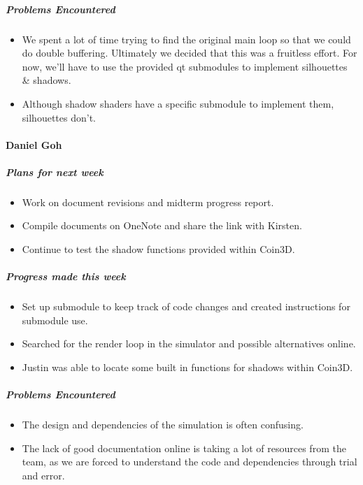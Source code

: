 {\subparagraph{Problems Encountered}
\begin{itemize}
  \item We spent a lot of time trying to find the original main loop so that we could do double buffering. Ultimately we decided that this was a fruitless effort. For now, we'll have to use the provided qt submodules to implement silhouettes & shadows.
  \item Although shadow shaders have a specific submodule to implement them, silhouettes don't.
\end{itemize}

\vspace{3mm}
\paragraph{Daniel Goh}
\subparagraph{Plans for next week}
\begin{itemize}
  \item Work on document revisions and midterm progress report.
  \item Compile documents on OneNote and share the link with Kirsten.
  \item Continue to test the shadow functions provided within Coin3D.
\end{itemize}

\subparagraph{Progress made this week}
\begin{itemize}
  \item Set up submodule to keep track of code changes and created instructions for submodule use.
  \item Searched for the render loop in the simulator and possible alternatives online.
  \item Justin was able to locate some built in functions for shadows within Coin3D.
\end{itemize}

\subparagraph{Problems Encountered}
\begin{itemize}
  \item The design and dependencies of the simulation is often confusing.
  \item The lack of good documentation online is taking a lot of resources from the team, as we are forced to understand the code and dependencies through trial and error.
\end{itemize}

}

\newpage

